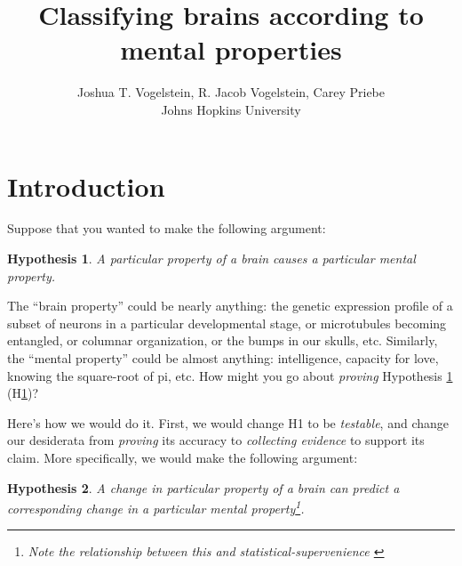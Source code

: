  
\usepackage{algorithmic} 
\usepackage{algorithm}

\newtheorem{goal}{Goal} 
\newtheorem{desid}{Desiderata} 
\newtheorem{hypo}{Hypothesis} 
\newcommand{\zz}{\mathbb{Z}} 
\newcommand{\nec}{NeCoG}
\newcommand{\MeB}{\mM \overset{\varepsilon}{{\sim}}_F \mB}

 

\title{Classifying brains according to mental properties}

\author{Joshua T. Vogelstein, R. Jacob Vogelstein, Carey Priebe\\{Johns Hopkins University}}



\maketitle
\begin{abstract}
\end{abstract}

\section{Introduction} 

\label{sec:introduction}

Suppose that you wanted to make the following argument: 
\begin{hypo}
	\label{h1} A particular property of a brain causes a particular mental property. 
\end{hypo}

The ``brain property'' could be nearly anything: the genetic expression profile of a subset of neurons in a particular developmental stage, or microtubules becoming entangled, or columnar organization, or the bumps in our skulls, etc. Similarly, the ``mental property'' could be almost anything: intelligence, capacity for love, knowing the square-root of pi, etc. How might you go about \emph{proving} Hypothesis \ref{h1} (H\ref{h1})?

Here's how we would do it. First, we would change H1 to be \emph{testable}, and change our desiderata from \emph{proving} its accuracy to \emph{collecting evidence} to support its claim. More specifically, we would make the following argument:
\begin{hypo}
	\label{h2} A change in particular property of a brain can predict a corresponding change in a particular mental property\footnote{Note the relationship between this and \emph{statistical-supervenience} \cite{VogelsteinPriebe10}}. 
\end{hypo}

